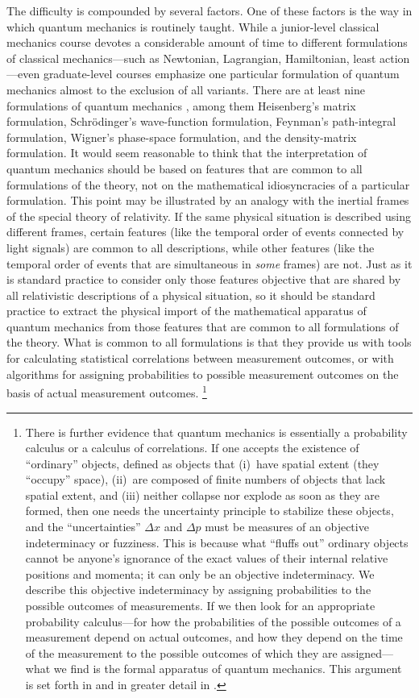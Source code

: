 The difficulty is compounded by several factors. One of these factors is the way in which quantum mechanics is routinely taught. While a junior-level classical mechanics course devotes a considerable amount of time to different formulations of classical mechanics---such as Newtonian, Lagrangian, Hamiltonian, least action---even graduate-level courses emphasize one particular formulation of quantum mechanics almost to the exclusion of all variants. There are at least nine formulations of quantum mechanics \citep{Styeretal}, among them Heisenberg's matrix formulation, Schr\"odinger's wave-function formulation, Feynman's path-integral formulation, Wigner's phase-space formulation, and the density-matrix formulation. It would seem reasonable to think that the interpretation of quantum mechanics should be based on features that are common to all formulations of the theory, not on the mathematical idiosyncracies of a particular formulation. This point may be illustrated by an analogy with the inertial frames of the special theory of relativity. If the same physical situation is described using different frames, certain features (like the temporal order of events connected by light signals) are common to all descriptions, while other features (like the temporal order of events that are simultaneous in \emph{some} frames) are not. Just as it is standard practice to consider only those features objective that are shared by all relativistic descriptions of a physical situation, so it should be standard practice to extract the physical import of the mathematical apparatus of quantum mechanics from those features that are common to all formulations of the theory. What is common to all formulations is that they provide us with tools for calculating statistical correlations between measurement outcomes, or with algorithms for assigning probabilities to possible measurement outcomes on the basis of actual measurement outcomes.%
\footnote{\label{oo}There is further evidence that quantum mechanics is essentially a probability calculus or a calculus of correlations. If one accepts the existence of ``ordinary'' objects, defined as objects that (i)~have spatial extent (they ``occupy'' space), (ii)~are composed of finite numbers of objects that lack spatial extent, and (iii) neither collapse nor explode as soon as they are formed, then one needs the uncertainty principle to stabilize these objects, and the ``uncertainties'' $\Delta x$ and $\Delta p$ must be measures of an objective indeterminacy or fuzziness. This is because what ``fluffs out'' ordinary objects cannot be anyone's ignorance of the exact values of their internal relative positions and momenta; it can only be an objective indeterminacy. We describe this objective indeterminacy by assigning probabilities to the possible outcomes of measurements. If we then look for an appropriate probability calculus---for how the probabilities of the possible outcomes of a measurement depend on actual outcomes, and how they depend on the time of the measurement to the possible outcomes of which they are assigned---what we find is the formal apparatus of quantum mechanics. This argument is set forth in \citep{Mohrhoff2009b} and in greater detail in \citep[Chapter 8]{Mohrhoff2011}.}

